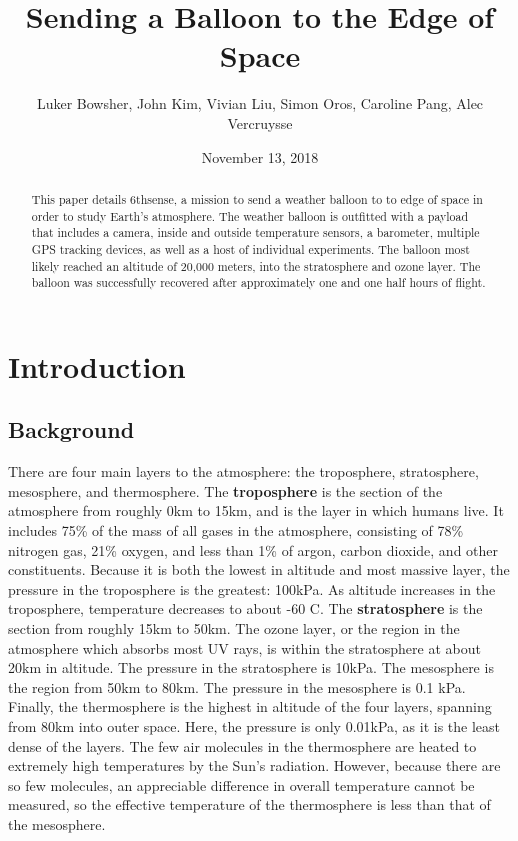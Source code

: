 \documentclass[12pt,]{article}
\title{Sending a Balloon to the Edge of Space}
\author{Luker Bowsher, John Kim, Vivian Liu, Simon Oros, Caroline Pang, Alec
Vercruysse}
\date{November 13, 2018}
\begin{document}
\maketitle
\begin{abstract}
This paper details 6thsense, a mission to send a weather balloon to to
edge of space in order to study Earth's atmosphere. The weather balloon
is outfitted with a payload that includes a camera, inside and outside
temperature sensors, a barometer, multiple GPS tracking devices, as well
as a host of individual experiments. The balloon most likely reached an
altitude of 20,000 meters, into the stratosphere and ozone layer. The
balloon was successfully recovered after approximately one and one half
hours of flight.
\end{abstract}

\newpage

\setcounter{secnumdepth}{3} \setcounter{tocdepth}{3} \tableofcontents
\newpage
\onehalfspacing

\section{Introduction}\label{introduction}

\subsection{Background}\label{background}

There are four main layers to the atmosphere: the troposphere,
stratosphere, mesosphere, and thermosphere. The \textbf{troposphere} is
the section of the atmosphere from roughly 0km to 15km, and is the layer
in which humans live. It includes 75\% of the mass of all gases in the
atmosphere, consisting of 78\% nitrogen gas, 21\% oxygen, and less than
1\% of argon, carbon dioxide, and other constituents. Because it is both
the lowest in altitude and most massive layer, the pressure in the
troposphere is the greatest: 100kPa. As altitude increases in the
troposphere, temperature decreases to about -60 \degree C. The
\textbf{stratosphere} is the section from roughly 15km to 50km. The
ozone layer, or the region in the atmosphere which absorbs most UV rays,
is within the stratosphere at about 20km in altitude. The pressure in
the stratosphere is 10kPa. The mesosphere is the region from 50km to
80km. The pressure in the mesosphere is 0.1 kPa. Finally, the
thermosphere is the highest in altitude of the four layers, spanning
from 80km into outer space. Here, the pressure is only 0.01kPa, as it is
the least dense of the layers. The few air molecules in the thermosphere
are heated to extremely high temperatures by the Sun's radiation.
However, because there are so few molecules, an appreciable difference
in overall temperature cannot be measured, so the effective temperature
of the thermosphere is less than that of the mesosphere.
\end{document}
